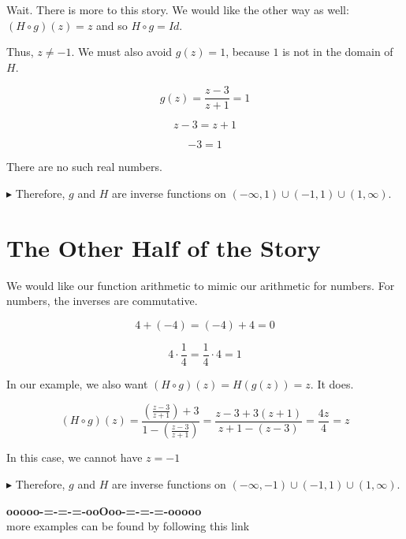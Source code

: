 \documentclass{ximera}
\begin{document}
Wait.  There is more to this story. We would like the other way as well: $(H \circ g)(z) = z$ and so $H \circ g = Id$.


Thus, $z \ne -1$.  We must also avoid $g(z) = 1$, because $1$ is not in the domain of $H$.



\[
g(z) = \frac{z-3}{z+1} = 1
\]

\[
z - 3 = z + 1 
\]


\[
-3 = 1
\]


There are no such real numbers.













$\blacktriangleright$ Therefore, $g$ and $H$ are inverse functions on $(-\infty, 1) \cup (-1, 1) \cup (1,\infty)$.




















\section*{The Other Half of the Story}


We would like our function arithmetic to mimic our arithmetic for numbers.  For numbers, the inverses are commutative.

\[
4 + (-4) = (-4) + 4 = 0
\]


\[
4 \cdot \frac{1}{4} = \frac{1}{4} \cdot 4 = 1
\]



In our example, we also want $(H \circ g)(z) = H(g(z)) = z$. It does.


\[
(H \circ g)(z) = \frac{\left( \frac{z-3}{z+1} \right) + 3}{1 - \left(  \frac{z-3}{z+1}\right)} = \frac{z-3 + 3(z+1)}{z+1-(z-3)} = \frac{4z}{4} = z
\]


In this case, we cannot have $z = -1$






$\blacktriangleright$  Therefore, $g$ and $H$ are inverse functions on $(-\infty, -1) \cup (-1, 1) \cup (1, \infty)$.
























\begin{center}
\textbf{\textcolor{green!50!black}{ooooo-=-=-=-ooOoo-=-=-=-ooooo}} \\

more examples can be found by following this link\\ 

\end{center}
\end{document}
